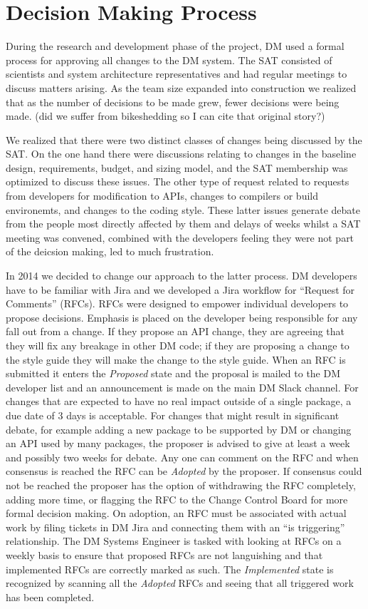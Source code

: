 \section{Decision Making Process}

During the research and development phase of the project, DM used a formal process for approving all changes to the DM system.
The SAT consisted of scientists and system architecture representatives and had regular meetings to discuss matters arising.
As the team size expanded into construction we realized that as the number of decisions to be made grew, fewer decisions were being made. (did we suffer from bikeshedding so I can cite that original story?)

We realized that there were two distinct classes of changes being discussed by the SAT.
On the one hand there were discussions relating to changes in the baseline design, requirements, budget, and sizing model, and the SAT membership was optimized to discuss these issues.
The other type of request related to requests from developers for modification to APIs, changes to compilers or build environemts, and changes to the coding style.
These latter issues generate debate from the people most directly affected by them and delays of weeks whilst a SAT meeting was convened, combined with the developers feeling they were not part of the deicsion making, led to much frustration.

In 2014 we decided to change our approach to the latter process.
DM developers have to be familiar with Jira and we developed a Jira workflow for ``Request for Comments'' (RFCs).
RFCs were designed to empower individual developers to propose decisions.
Emphasis is placed on the developer being responsible for any fall out from a change.
If they propose an API change, they are agreeing that they will fix any breakage in other DM code; if they are proposing a change to the style guide they will make the change to the style guide.
When an RFC is submitted it enters the \emph{Proposed} state and the proposal is mailed to the DM developer list and an announcement is made on the main DM Slack channel.
For changes that are expected to have no real impact outside of a single package, a due date of 3 days is acceptable.
For changes that might result in significant debate, for example adding a new package to be supported by DM or changing an API used by many packages, the proposer is advised to give at least a week and possibly two weeks for debate.
Any one can comment on the RFC and when consensus is reached the RFC can be \emph{Adopted} by the proposer.
If consensus could not be reached the proposer has the option of withdrawing the RFC completely, adding more time, or flagging the RFC to the Change Control Board for more formal decision making.
On adoption, an RFC must be associated with actual work by filing tickets in DM Jira and connecting them with an ``is triggering'' relationship.
The DM Systems Engineer is tasked with looking at RFCs on a weekly basis to ensure that proposed RFCs are not languishing and that implemented RFCs are correctly marked as such.
The \emph{Implemented} state is recognized by scanning all the \emph{Adopted} RFCs and seeing that all triggered work has been completed.

